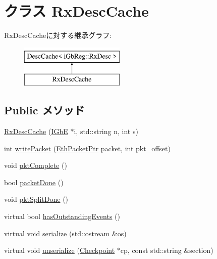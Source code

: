 \hypertarget{classIGbE_1_1RxDescCache}{
\section{クラス RxDescCache}
\label{classIGbE_1_1RxDescCache}
}
RxDescCacheに対する継承グラフ:\begin{figure}[H]
\begin{center}
\leavevmode
\includegraphics[height=2cm]{classIGbE_1_1RxDescCache}
\end{center}
\end{figure}
\subsection*{Public メソッド}
\begin{DoxyCompactItemize}
\item 
\hyperlink{classIGbE_1_1RxDescCache_aa0df94c8316951374e466ed453451b26}{RxDescCache} (\hyperlink{classIGbE}{IGbE} $\ast$i, std::string n, int s)
\item 
int \hyperlink{classIGbE_1_1RxDescCache_a3e213f353f926628fed12519b96f1b47}{writePacket} (\hyperlink{classRefCountingPtr}{EthPacketPtr} packet, int pkt\_\-offset)
\item 
void \hyperlink{classIGbE_1_1RxDescCache_a4f0881be8aa8698e16dcf52a89085100}{pktComplete} ()
\item 
bool \hyperlink{classIGbE_1_1RxDescCache_a430d1dfdf7dcec48b02f69d6769acab6}{packetDone} ()
\item 
void \hyperlink{classIGbE_1_1RxDescCache_a05f4f640320394e21432a2d1c2ce8edc}{pktSplitDone} ()
\item 
virtual bool \hyperlink{classIGbE_1_1RxDescCache_a2587421ae644a9474416e5a5b63ccbca}{hasOutstandingEvents} ()
\item 
virtual void \hyperlink{classIGbE_1_1RxDescCache_a53e036786d17361be4c7320d39c99b84}{serialize} (std::ostream \&os)
\item 
virtual void \hyperlink{classIGbE_1_1RxDescCache_af22e5d6d660b97db37003ac61ac4ee49}{unserialize} (\hyperlink{classCheckpoint}{Checkpoint} $\ast$cp, const std::string \&section)
\end{DoxyCompactItemize}
